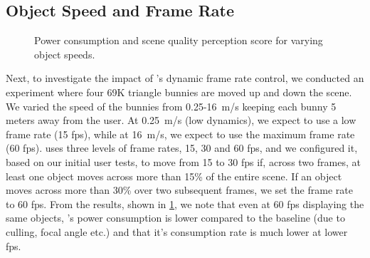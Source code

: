 


\subsection{Object Speed and Frame Rate}


\begin{figure}[t]
    \centering
    \vspace{-1ex}
    \vspace{-2ex}
    \caption{Power consumption and scene quality perception score for varying object speeds.}
    \label{fig:lpgl-objSpeed-all}
\end{figure}


Next, to investigate the impact of {\myit}'s dynamic frame rate control, we conducted an experiment where four 69K triangle bunnies are moved up and down the scene.  We varied the speed of the bunnies from 0.25-16~m/s keeping each bunny 5 meters away from the user. At 0.25~m/s (low dynamics), we expect {\myit} to use a low frame rate (15 fps), while at 16~m/s, we expect {\myit} 
to use the maximum frame rate (60 fps). {\myit} uses three levels of frame rates, 15, 30 and 60 fps, and we configured it, based on our initial user tests, to move from 15 to 30 fps if, across two frames, at least one object moves across more than 15\% of the entire scene. If an object moves across more than 30\% over two subsequent frames, we set the frame rate to 60 fps.
%
From the results, shown in \fig\ref{fig:lpgl-objSpeed-all}, we note that even at 60 fps displaying the same objects, {\myit}'s power consumption is lower 
compared to the baseline (due to culling, focal angle etc.) and that it's consumption rate is much lower at lower fps.

%

